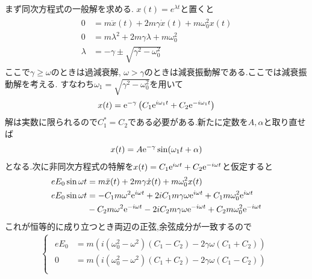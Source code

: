 \setcounter{subsection}{3}
\subsubsection{}
まず同次方程式の一般解を求める. $x(t)=e^{\lambda t}$と置くと
\begin{align}
  \begin{split}
    0&=m\ddot{x}(t)+2m\gamma\dot{x}(t)+m\omega_0^2x(t)\\
    0&=m\lambda^2+2m\gamma\lambda+m\omega_0^2\\
    \lambda&=-\gamma\pm\sqrt{\gamma^2-\omega_0^2}
  \end{split}
\end{align}
ここで$\gamma\geq\omega$のときは過減衰解, $\omega>\gamma$のときは減衰振動解である.ここでは減衰振動解を考える.
すなわち$\omega_1=\sqrt{\gamma^2-\omega_0^2}$を用いて
\begin{align}
  x(t)={\rm e}^{-\gamma}\left(C_1{\rm e}^{i\omega_1 t}+C_2{\rm e}^{-i\omega_1 t}\right)
\end{align}
解は実数に限られるので$C_1^*=C_2$である必要がある.新たに定数を$A,\alpha$と取り直せば
\begin{align}
  x(t)=A{\rm e}^{-\gamma}\sin(\omega_1 t+\alpha)
\end{align}
となる.次に非同次方程式の特解を$x(t)=C_1{\rm e}^{i\omega t}+C_2{\rm e}^{-i\omega t}$と仮定すると
\begin{align}
  \begin{split}
    eE_0\sin\omega t&=m\ddot{x}(t)+2m\gamma\dot{x}(t)+m\omega_0^2x(t)\\
    eE_0\sin\omega t&=-C_1m\omega^2{\rm e}^{i\omega t}+2iC_1m\gamma\omega{\rm e}^{i\omega t}+C_1m\omega_0^2{\rm e}^{i\omega t}\\
    &-C_2m\omega^2{\rm e}^{-i\omega t}-2iC_2m\gamma\omega{\rm e}^{-i\omega t}+C_2m\omega_0^2{\rm e}^{-i\omega t}\\
  \end{split}
\end{align}
これが恒等的に成り立つとき両辺の正弦,余弦成分が一致するので
\begin{align}
  \begin{cases}
    \begin{split}
      eE_0&=m\left(i(\omega_0^2-\omega^2)(C_1-C_2)-2\gamma\omega(C_1+C_2)\right)\\
      0&=m\left(i(\omega_0^2-\omega^2)(C_1+C_2)-2\gamma\omega(C_1-C_2)\right)\\
    \end{split}
  \end{cases}
\end{align}
